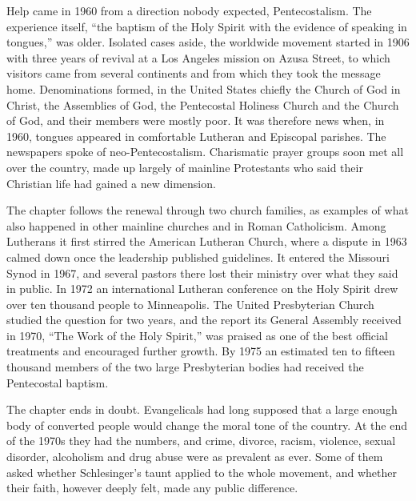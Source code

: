 Help came in 1960 from a direction nobody expected, Pentecostalism. The experience itself, ``the
baptism of the Holy Spirit with the evidence of speaking in tongues,'' was older. Isolated cases
aside, the worldwide movement started in 1906 with three years of revival at a Los Angeles mission on Azusa Street, to which visitors came from several continents and from which they took the message
home. Denominations formed, in the United States chiefly the Church of God in Christ, the Assemblies of God, the Pentecostal Holiness Church and the Church of God, and their members were mostly poor.
It was therefore news when, in 1960, tongues appeared in comfortable Lutheran and Episcopal parishes.
The newspapers spoke of neo-Pentecostalism. Charismatic prayer groups soon met all over the country,
made up largely of mainline Protestants who said their Christian life had gained a new dimension.

The chapter follows the renewal through two church families, as examples of what also happened in
other mainline churches and in Roman Catholicism. Among Lutherans it first stirred the American
Lutheran Church, where a dispute in 1963 calmed down once the leadership published guidelines. It
entered the Missouri Synod in 1967, and several pastors there lost their ministry over what they said
in public. In 1972 an international Lutheran conference on the Holy Spirit drew over ten thousand
people to Minneapolis. The United Presbyterian Church studied the question for two years, and the
report its General Assembly received in 1970, ``The Work of the Holy Spirit,'' was praised as one of
the best official treatments and encouraged further growth. By 1975 an estimated ten to fifteen
thousand members of the two large Presbyterian bodies had received the Pentecostal baptism.

The chapter ends in doubt. Evangelicals had long supposed that a large enough body of converted
people would change the moral tone of the country. At the end of the 1970s they had the numbers, and
crime, divorce, racism, violence, sexual disorder, alcoholism and drug abuse were as prevalent as
ever. Some of them asked whether Schlesinger's taunt applied to the whole movement, and whether
their faith, however deeply felt, made any public difference.


